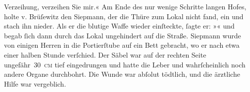                Verzeihung, verzeihen Sie mir.« Am Ende des nur wenige Schritte langen Hofes, holte
                  v. Brüſewitz den Siepmann, der die Thüre zum Lokal nicht fand, ein und stach ihn
               nieder. Als er die blutige Waffe wieder einſteckte, ſagte er: »« und begab ſich dann durch das Lokal ungehindert auf die
               Straße. Siepmann wurde von einigen Herren in
               die Portierſtube auf ein Bett gebracht, wo er nach etwa einer halben Stunde
               verſchied. Der Säbel war auf der rechten Seite ungefähr 30 \textsc{cm}
               tief eingedrungen und hatte die Leber und wahrſcheinlich noch andere Organe
               durchbohrt. Die Wunde war abſolut tödtlich, und die ärztliche Hilfe war
               vergeblich.\pend
           \endnumbering{}  
      